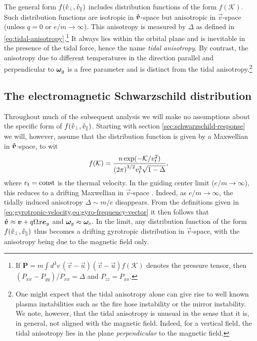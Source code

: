 \documentclass[aps,pre,notitlepage,amsmath,amssymb,amsfonts,nobibnotes,nofootinbib,superscriptaddress]{revtex4-1}
\begin{document}
The general form $f(\mathring{v}_\perp,\mathring{v}_\parallel)$ includes distribution functions
of the form $f(\mathcal{K})$. Such distribution functions are isotropic in
$\bm{\mathring{v}}$-space but anisotropic in $\vec{v}$-space (unless $q=0$ or
$e/m\to\infty$). This anisotropy is measured by $\Delta$ as defined in
\cref{eq:tidal-anisotropy}.\footnote{If
  $\mathbf{P}=m\int\!d^3v\,(\vec{v}-\vec{u})(\vec{v}-\vec{u})f(\mathcal{K})$
  denotes the pressure tensor, then $(P_{xx}-P_{yy})/P_{xx}=\Delta$ and
  $P_{zz}=P_{xx}$.} It always lies within the orbital plane and is inevitable
in the presence of the tidal force, hence the name \emph{tidal anisotropy}. By
contrast, the anisotropy due to different temperatures in the direction
parallel and perpendicular to $\bm{\omega}_g$ is a free parameter and is distinct from
the tidal anisotropy.\footnote{One might expect that the tidal anisotropy
  alone can give rise to well known plasma instabilities such as the fire hose
  instability or the mirror instability. We note, however, that the tidal
  anisotropy is unusual in the sense that it is, in general, not aligned with
  the magnetic field. Indeed, for a vertical field, the tidal anisotropy lies
  in the plane \emph{perpendicular} to the magnetic field.}

\subsection{The electromagnetic Schwarzschild distribution}

Throughout much of the subsequent analysis we will make no assumptions about
the specific form of $f(\mathring{v}_\perp,\mathring{v}_\parallel)$. Starting with section
\cref{sec:schwarzschild-response} we will, however, assume that the
distribution function is given by a Maxwellian in $\bm{\mathring{v}}$-space, to wit
\begin{equation}
  \label{em:schwarzschild}
  f(\mathcal{K}) =
  \frac{n\exp(-\mathcal{K}/\vt^2)}{{(2\pi)}^{3/2}\vt^3\sqrt{1-\Delta}},
\end{equation}
where $v_t=\mathrm{const}$ is the thermal velocity. In the guiding center
limit ($e/m\to\infty$), this reduces to a drifting Maxwellian in
$\vec{v}$-space \citep[as used in e.g.][]{Quataert2002}. Indeed, as
$e/m\to\infty$, the tidally induced anisotropy $\Delta\sim{}m/e$ disappears.
From the definitions given in
\cref{eq:gyrotropic-velocity,eq:gyro-frequency-vector} it then follows that
$\bm{\mathring{v}}\approx\bm{v}+q\Omega{}x\bm{e}_y$ and $\bm{\omega}_g\approx\bm{\omega}_c$. In the limit, any
distribution function of the form $f(\mathring{v}_\perp,\mathring{v}_\parallel)$ thus becomes a
drifting gyrotropic distribution in $\vec{v}$-space, with the anisotropy being
due to the magnetic field only.
\end{document}
